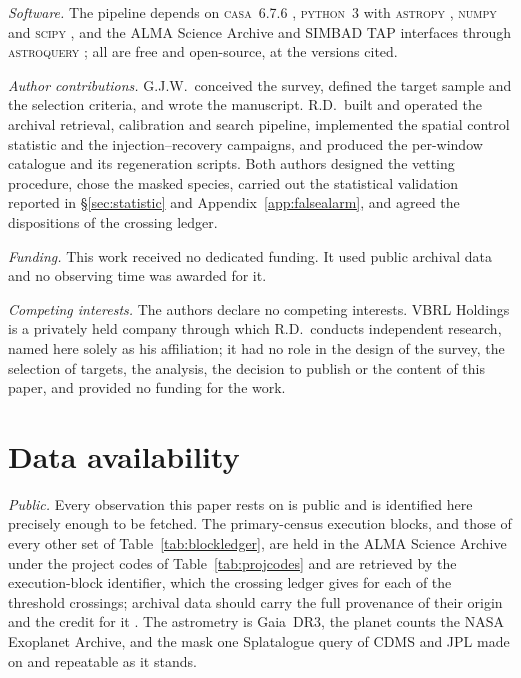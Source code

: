 \emph{Software.} The pipeline depends on \textsc{casa}~6.7.6
\citep{CASA2022}, \textsc{python}~3 with \textsc{astropy} \citep{Astropy2022}, \textsc{numpy}
\citep{Harris2020} and \textsc{scipy} \citep{Virtanen2020}, and the ALMA Science
Archive and SIMBAD TAP interfaces through \textsc{astroquery} \citep{Ginsburg2019};
all are free and open-source, at the versions cited.

\emph{Author contributions.} G.J.W.\ conceived the survey, defined the target sample and the selection
criteria, and wrote the manuscript. R.D.\ built and operated the archival
retrieval, calibration and search pipeline, implemented the spatial control
statistic and the injection--recovery campaigns, and produced the per-window
catalogue and its regeneration scripts. Both authors designed the vetting
procedure, chose the masked species, carried out the statistical
validation reported in \S\ref{sec:statistic} and
Appendix~\ref{app:falsealarm}, and agreed the dispositions of
the crossing ledger.

\emph{Funding.} This work received no dedicated funding. It used public archival data and
no observing time was awarded for it.

\emph{Competing interests.} The authors declare no competing interests. VBRL Holdings is a privately
held company through which R.D.\ conducts independent research, named
here solely as his affiliation; it had no role in the design of the
survey, the selection of targets, the analysis, the decision to publish
or the content of this paper, and provided no funding for the work.

\section*{Data availability}
\label{sec:data}
\emph{Public.} Every observation this paper rests on is public and is
identified here precisely enough to be fetched. The \NEB{} primary-census
execution blocks, and those of every other set of
Table~\ref{tab:blockledger}, are held in the ALMA Science Archive under the
\NProjCodes{} project codes of Table~\ref{tab:projcodes} and are retrieved by
the execution-block identifier, which the crossing ledger gives for each of
the \EvNCrossRaw{} threshold crossings; archival data should carry the full
provenance of their origin and the credit for it \citep{Chen2022}.
The astrometry is Gaia~DR3, the planet counts the NASA Exoplanet Archive, and
the mask one Splatalogue query of CDMS and JPL made on \McQueryDate{} and
repeatable as it stands.

